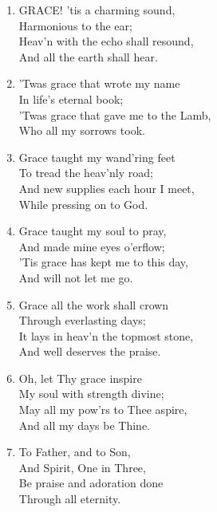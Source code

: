 \begin{enumerate}
    \item GRACE! 'tis a charming sound, \\
        Harmonious to the ear; \\
        Heav'n with the echo shall resound, \\
        And all the earth shall hear.

    \item 'Twas grace that wrote my name \\
        In life's eternal book; \\
        'Twas grace that gave me to the Lamb, \\
        Who all my sorrows took.

    \item Grace taught my wand'ring feet \\
        To tread the heav'nly road; \\
        And new supplies each hour I meet, \\
        While pressing on to God.

    \item Grace taught my soul to pray, \\
        And made mine eyes o'erflow; \\
        'Tis grace has kept me to this day, \\
        And will not let me go.

    \item Grace all the work shall crown \\
        Through everlasting days; \\
        It lays in heav'n the topmost stone, \\
        And well deserves the praise.

    \item Oh, let Thy grace inspire \\
        My soul with strength divine; \\
        May all my pow'rs to Thee aspire, \\
        And all my days be Thine.

    \item To Father, and to Son, \\
        And Spirit, One in Three, \\
        Be praise and adoration done \\
        Through all eternity.

\end{enumerate}

